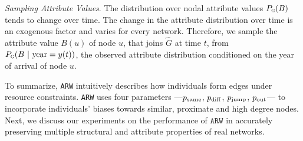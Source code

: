 \textit{Sampling Attribute Values}.
The distribution over nodal attribute values $P_{\textsc{g}}(B)$ tends to change over time.
The change in the attribute distribution over time is an exogenous factor and varies for every network.
Therefore, we sample the attribute value $B(u)$ of node $u$, that joins $\hat{G}$ at time
$t$, from $P_{\textsc{g}}(B{\mbox{ | year}=y(t)})$, the observed attribute
distribution conditioned on the year of arrival of node $u$.

To summarize, \texttt{ARW}
intuitively describes how individuals form edges under resource constraints.
\texttt{ARW} uses four parameters ---$p_{\scriptsize\mbox{same}}$, $p_{\scriptsize\mbox{diff}}$, $p_{\scriptsize\mbox{jump}}$, $p_{\scriptsize\mbox{out}}$--- to incorporate
individuals' biases towards similar, proximate and high degree nodes.
Next, we discuss our experiments on the performance of $\texttt{ARW}$
in accurately preserving {multiple} structural and attribute properties of real networks.

